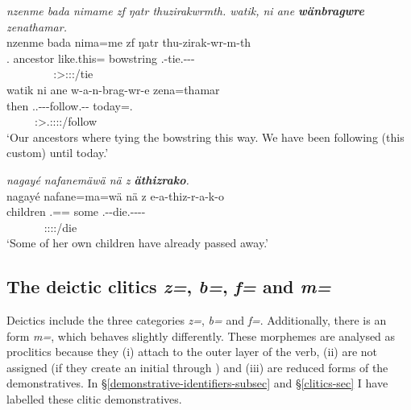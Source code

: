 \begin{exe}
	\ex \emph{nzenme bada nimame zf ŋatr thuzirakwrmth. watik, ni ane \textbf{wänbragwre} zenathamar.}\\
	\glll nzenme bada nima=me zf ŋatr thu-zirak-wr-m-th\\
	\Fnsg.{\Poss} ancestor like.this={\Ins} {\Imm} bowstring \Stnsg.\Betaone{}-tie.\Ext-\Ndu-\Dur-\Stnsg{}\\
	~ ~ ~ ~ ~ {\footnotesize \Stpl:\Sbj>\Stpl:\Obj:\Pst:\Dur/tie}\\
	\sn
	\glll  watik ni ane w-a-n-brag-wr-e zena=thamar\\
	then {\Fnsg} {\Dem} \Tsg.\F.\Alph-\Vc-\Venit-follow.\Ext-\Ndu-{\Fnsg} today=\Temp.{\All}\\
	 ~ ~ ~ {\footnotesize \Fpl:\Sbj>\Tsg.\F:\Obj:\Nonpast:\Ipfv:\Venit/follow} ~\\
	\trans `Our ancestors where tying the bowstring this way. We have been following (this custom) until today.' 
	\label{ex261}
\end{exe}
\begin{exe}
	\ex \emph{nagayé nafanemäwä nä z \textbf{äthizrako}.}\\
	\glll nagayé nafane=ma=wä nä z e-a-thiz-r-a-k-o\\
	children \Tsg.\Poss=\Char={\Emph} some {\Iam} \Stnsg.\Alph-\Vc-die.\Ext-\Ndu-\Pst-\Lk-\Andat{}\\
	~ ~ ~ ~ {\footnotesize \Stpl:\Sbj:\Pst:\Ipfv:\Andat/die}\\
	\trans `Some of her own children have already passed away.'\\ 
	\label{ex263}
\end{exe}

\subsection{The deictic clitics \emph{z=}, \emph{b=}, \emph{f=} and \emph{m=}} \label{deicticcliticssection}

Deictics include the three categories  \emph{z=},  \emph{b=} and  \emph{f=}. Additionally, there is an  form \emph{m=}, which behaves slightly differently. These morphemes are analysed as proclitics because they (i) attach to the outer layer of the verb, (ii) are not assigned  (if they create an initial  through ) and (iii) are reduced forms of the demonstratives. In {\S}\ref{demonstrative-identifiers-subsec} and {\S}\ref{clitics-sec} I have labelled these clitic demonstratives.


